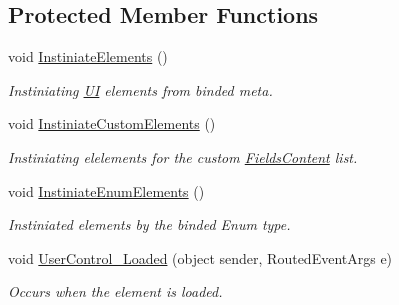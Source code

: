 \subsection*{Protected Member Functions}
\begin{DoxyCompactItemize}
\item 
void \mbox{\hyperlink{class_wpf_handler_1_1_u_i_1_1_controls_1_1_flat_toggles_group_a58a008dadfd937ce1379ee16602139bd}{Instiniate\+Elements}} ()
\begin{DoxyCompactList}\small\item\em Instiniating \mbox{\hyperlink{namespace_wpf_handler_1_1_u_i}{UI}} elements from binded meta. \end{DoxyCompactList}\item 
void \mbox{\hyperlink{class_wpf_handler_1_1_u_i_1_1_controls_1_1_flat_toggles_group_a02dd935c06724428d0782839f0035189}{Instiniate\+Custom\+Elements}} ()
\begin{DoxyCompactList}\small\item\em Instiniating elelements for the custom \mbox{\hyperlink{class_wpf_handler_1_1_u_i_1_1_controls_1_1_flat_toggles_group_a48c85f0f2ca803d28b95877dbc0122f0}{Fields\+Content}} list. \end{DoxyCompactList}\item 
void \mbox{\hyperlink{class_wpf_handler_1_1_u_i_1_1_controls_1_1_flat_toggles_group_af854af2e1f2768daedecb38eb983072f}{Instiniate\+Enum\+Elements}} ()
\begin{DoxyCompactList}\small\item\em Instiniated elements by the binded Enum type. \end{DoxyCompactList}\item 
void \mbox{\hyperlink{class_wpf_handler_1_1_u_i_1_1_controls_1_1_flat_toggles_group_a8e8bd8928ac0cba35f35554adad3f077}{User\+Control\+\_\+\+Loaded}} (object sender, Routed\+Event\+Args e)
\begin{DoxyCompactList}\small\item\em Occurs when the element is loaded. \end{DoxyCompactList}\end{DoxyCompactItemize}

